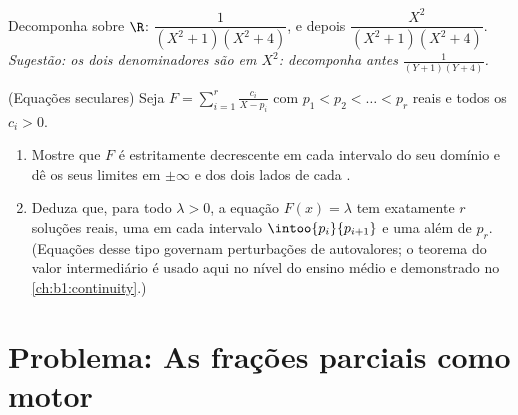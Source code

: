 \begin{exercise}[$\star\star$]\label{exo:b1:fractions:11}
Decomponha sobre $\R$: $\dfrac{1}{(X^2+1)(X^2+4)}$, e depois
$\dfrac{X^2}{(X^2+1)(X^2+4)}$. \emph{Sugestão: os dois denominadores são
 em $X^2$: decomponha antes $\frac1{(Y+1)(Y+4)}$.}
\end{exercise}

\begin{exercise}[$\star\star\star$]\label{exo:b1:fractions:12}
(Equações seculares) Seja $F = \sum_{i=1}^{r} \frac{c_i}{X - p_i}$
com $p_1 < p_2 < \dots < p_r$ reais e todos os $c_i > 0$.
\begin{enumerate}
  \item Mostre que $F$ é estritamente decrescente em cada intervalo do
        seu domínio e dê os seus limites em $\pm\infty$ e dos dois
        lados de cada .
  \item Deduza que, para todo $\lambda > 0$, a equação $F(x) =
        \lambda$ tem exatamente $r$ soluções reais, uma em cada
        intervalo $\intoo{p_i}{p_{i+1}}$ e uma além de $p_r$.
        (Equações desse tipo governam perturbações de autovalores; o
        teorema do valor intermediário é usado aqui no nível do ensino
        médio e demonstrado no \cref{ch:b1:continuity}.)
\end{enumerate}
\end{exercise}

\section{Problema: As frações parciais como motor}

